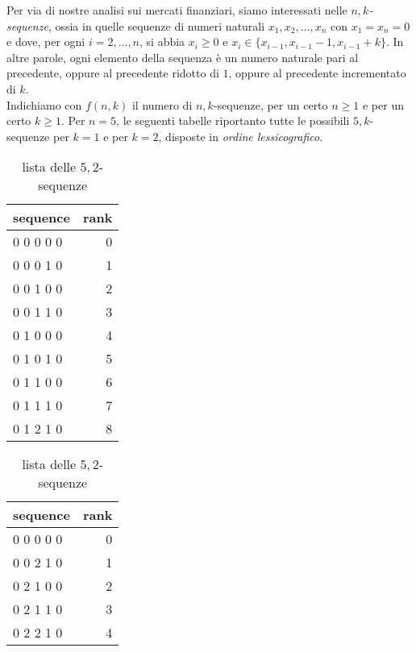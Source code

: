 \renewcommand{\nomebreve}{k\_up\_1\_down\_seq}
\renewcommand{\titolo}{Count the possible sequences with uprisings of size k and downfalls of 1\\}

\introduzione{}

Per via di nostre analisi sui mercati finanziari, siamo interessati nelle $n,k$\emph{-sequenze}, ossia in quelle sequenze di numeri naturali $x_1, x_2, \ldots, x_n$
con $x_1=x_n=0$ e dove, per ogni $i=2,\ldots, n$, si abbia $x_i \geq 0$
e $x_i \in \{x_{i-1}, x_{i-1}-1, x_{i-1}+k\}$.
In altre parole, ogni elemento della sequenza è un numero naturale pari al precedente, oppure al precedente ridotto di $1$, oppure al precedente incrementato di $k$.\\ 

Indichiamo con $f(n,k)$ il numero di $n,k$-sequenze, per un certo $n\geq 1$ e per un certo $k\geq 1$. Per $n=5$, le seguenti tabelle riportanto tutte le possibili $5,k$-sequenze per $k=1$ e per $k=2$, disposte in \emph{ordine lessicografico}.

\begin{table}[!h]
  \begin{minipage}{.5\textwidth}
    \centering
    \begin{tabular}{l|r}
      \textbf{sequence} & \textbf{rank} \\
      \hline
      0 0 0 0 0 & 0 \\
      0 0 0 1 0 & 1 \\
      0 0 1 0 0 & 2 \\
      0 0 1 1 0 & 3 \\
      0 1 0 0 0 & 4 \\
      0 1 0 1 0 & 5 \\
      0 1 1 0 0 & 6 \\
      0 1 1 1 0 & 7 \\
      0 1 2 1 0 & 8 \\
    \end{tabular}
    \caption{lista delle $5,1$-sequenze}
  \end{minipage}%
  \begin{minipage}{.5\textwidth}
    \centering
    \begin{tabular}{l|r}
      \textbf{sequence} & \textbf{rank} \\
      \hline
      0 0 0 0 0 & 0 \\
      0 0 2 1 0 & 1 \\
      0 2 1 0 0 & 2 \\
      0 2 1 1 0 & 3 \\
      0 2 2 1 0 & 4 \\
    \end{tabular}
    \caption{lista delle $5,2$-sequenze}
    \end{minipage}
\end{table}

